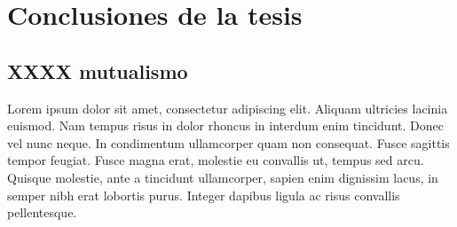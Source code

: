 
\chapter{Conclusiones de la tesis} %

\label{chapterCONCLUSIONES} %


\section{XXXX mutualismo}

Lorem ipsum dolor sit amet, consectetur adipiscing elit. Aliquam ultricies lacinia euismod. Nam tempus risus in dolor rhoncus in interdum enim tincidunt. Donec vel nunc neque. In condimentum ullamcorper quam non consequat. Fusce sagittis tempor feugiat. Fusce magna erat, molestie eu convallis ut, tempus sed arcu. Quisque molestie, ante a tincidunt ullamcorper, sapien enim dignissim lacus, in semper nibh erat lobortis purus. Integer dapibus ligula ac risus convallis pellentesque.
